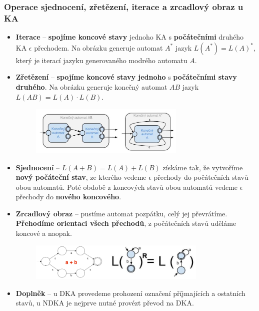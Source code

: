 \subsubsection{Operace sjednocení, zřetězení, iterace a zrcadlový obraz u KA}
\begin{itemize}
	\item \textbf{Iterace} -- \textbf{spojíme koncové stavy} jednoho KA s \textbf{počátečními} druhého KA $\epsilon$ přechodem. Na obrázku generuje automat $A^*$ jazyk $L(A^*) = L(A)^*$, který je iterací jazyku generovaného modrého automatu $A$.
	\item \textbf{Zřetězení} -- \textbf{spojíme koncové stavy jednoho} s \textbf{počátečními stavy druhého}. Na obrázku generuje konečný automat $AB$ jazyk $L(AB) = L(A) \cdot L(B)$.
	\begin{figure}[H]
		\centering
		\includegraphics[width=0.7\textwidth]{assets/ka_zret}
	\end{figure}
	\item \textbf{Sjednocení} -- $L(A + B) = L(A) + L(B)$ získáme tak, že vytvoříme \textbf{nový počáteční stav}, ze kterého vedeme $\epsilon$ přechody do počátečních stavů obou automatů. Poté obdobě z koncových stavů obou automatů vedeme $\epsilon$ přechody do \textbf{nového koncového}.
	\item \textbf{Zrcadlový obraz} -- pustíme automat pozpátku, celý jej převrátíme. \textbf{Přehodíme orientaci všech přechodů}, z počátečních stavů uděláme koncové a naopak.
	\begin{figure}[H]
		\centering
		\includegraphics[width=0.8\textwidth]{assets/ka_zrcd}
	\end{figure}
	\item \textbf{Doplněk} -- u DKA provedeme prohození označení příjmajících a ostatních stavů, u NDKA je nejprve nutné provézt převod na DKA.
\end{itemize}
